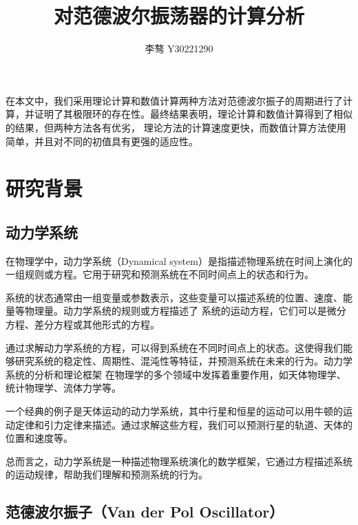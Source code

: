 \documentclass[10.5pt,oneside,a4paper]{article}
\title{\textbf{对范德波尔振荡器的计算分析}}
\author{\zihao{-4} 李骜 \quad Y30221290}
\date{}
\theoremstyle{mystyle}
\begin{document}
\maketitle
\thispagestyle{fancy}
\vspace{-1cm}
\setlength{\abstitleskip}{-2em}
\setlength{\absleftindent}{0pt}
\setlength{\absrightindent}{0pt}
\begin{onecolabstract}
\songti {}
在本文中，我们采用理论计算和数值计算两种方法对范德波尔振子的周期进行了计算，并证明了其极限环的存在性。最终结果表明，理论计算和数值计算得到了相似的结果，但两种方法各有优劣，
理论方法的计算速度更快，而数值计算方法使用简单，并且对不同的初值具有更强的适应性。

\vspace{-1em}
\end{onecolabstract}

\vspace{1em}

\section{研究背景}

\subsection{动力学系统}

在物理学中，动力学系统（Dynamical system）是指描述物理系统在时间上演化的一组规则或方程。它用于研究和预测系统在不同时间点上的状态和行为。

系统的状态通常由一组变量或参数表示，这些变量可以描述系统的位置、速度、能量等物理量。动力学系统的规则或方程描述了
系统的运动方程，它们可以是微分方程、差分方程或其他形式的方程。

通过求解动力学系统的方程，可以得到系统在不同时间点上的状态。这使得我们能够研究系统的稳定性、周期性、混沌性等特征，并预测系统在未来的行为。动力学系统的分析和理论框架
在物理学的多个领域中发挥着重要作用，如天体物理学、统计物理学、流体力学等。

一个经典的例子是天体运动的动力学系统，其中行星和恒星的运动可以用牛顿的运动定律和引力定律来描述。通过求解这些方程，我们可以预测行星的轨道、天体的位置和速度等。

总而言之，动力学系统是一种描述物理系统演化的数学框架，它通过方程描述系统的运动规律，帮助我们理解和预测系统的行为。

\subsection{范德波尔振子（Van der Pol Oscillator）}
\end{document}
